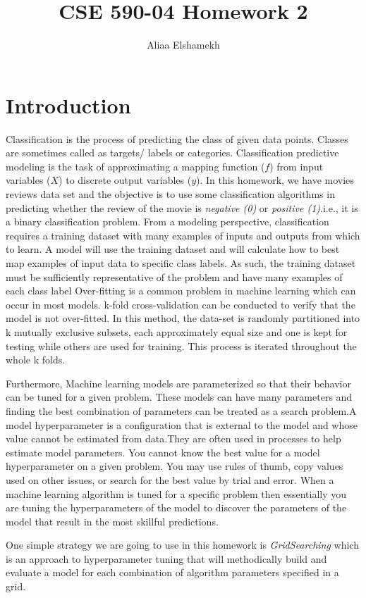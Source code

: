 \documentclass{article}
\title{CSE 590-04 Homework 2 }
\author{Aliaa Elshamekh}
\begin{document}
\maketitle
\section{Introduction}
Classification is the process of predicting the class of given data points. Classes are sometimes called as targets/ labels or categories. Classification predictive modeling is the task of approximating a mapping function ($f$) from input variables ($X$) to discrete output variables ($y$).
In this homework, we have movies reviews data set and the objective is to use some classification algorithms in predicting whether the review of the movie is \textit{negative (0)} or \textit{positive (1)}.i.e., it is a binary classification problem.
From a modeling perspective, classification requires a training dataset with many examples of inputs and outputs from which to learn.
A model will use the training dataset and will calculate how to best map examples of input data to specific class labels. As such, the training dataset must be sufficiently representative of the problem and have many examples of each class label
Over-fitting is a common problem in machine learning which can occur in most models. k-fold cross-validation can be conducted to verify that the model is not over-fitted. In this method, the data-set is randomly partitioned into k mutually exclusive subsets, each approximately equal size and one is kept for testing while others are used for training. This process is iterated throughout the whole k folds.

Furthermore, Machine learning models are parameterized so that their behavior can be tuned for a given problem. These models can have many parameters and finding the best combination of parameters can be treated as a search problem.A model hyperparameter is a configuration that is external to the model and whose value cannot be estimated from data.They are often used in processes to help estimate model parameters.
You cannot know the best value for a model hyperparameter on a given problem. You may use rules of thumb, copy values used on other issues, or search for the best value by trial and error. When a machine learning algorithm is tuned for a specific problem then essentially you are tuning the hyperparameters of the model to discover the parameters of the model that result in the most skillful predictions.

One simple strategy we are going to use in this homework is \textit{GridSearching} which  is an approach to hyperparameter tuning that will methodically build and evaluate a model for each combination of algorithm parameters specified in a grid.
\end{document}
